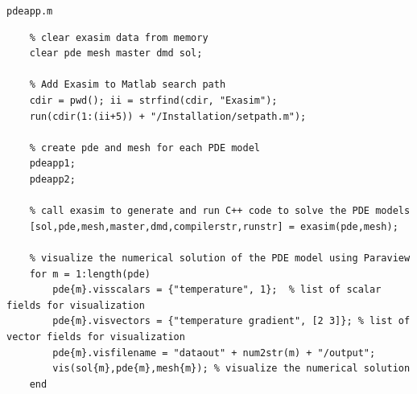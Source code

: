 \documentclass[12pt, a4paper]{report}
\begin{document}
\large \texttt{pdeapp.m}
\begin{lstlisting}
    % clear exasim data from memory
    clear pde mesh master dmd sol;

    % Add Exasim to Matlab search path
    cdir = pwd(); ii = strfind(cdir, "Exasim");
    run(cdir(1:(ii+5)) + "/Installation/setpath.m");

    % create pde and mesh for each PDE model
    pdeapp1;
    pdeapp2;

    % call exasim to generate and run C++ code to solve the PDE models
    [sol,pde,mesh,master,dmd,compilerstr,runstr] = exasim(pde,mesh);

    % visualize the numerical solution of the PDE model using Paraview
    for m = 1:length(pde)
        pde{m}.visscalars = {"temperature", 1};  % list of scalar fields for visualization
        pde{m}.visvectors = {"temperature gradient", [2 3]}; % list of vector fields for visualization
        pde{m}.visfilename = "dataout" + num2str(m) + "/output";  
        vis(sol{m},pde{m},mesh{m}); % visualize the numerical solution
    end
\end{lstlisting}

\clearpage
\end{document}
